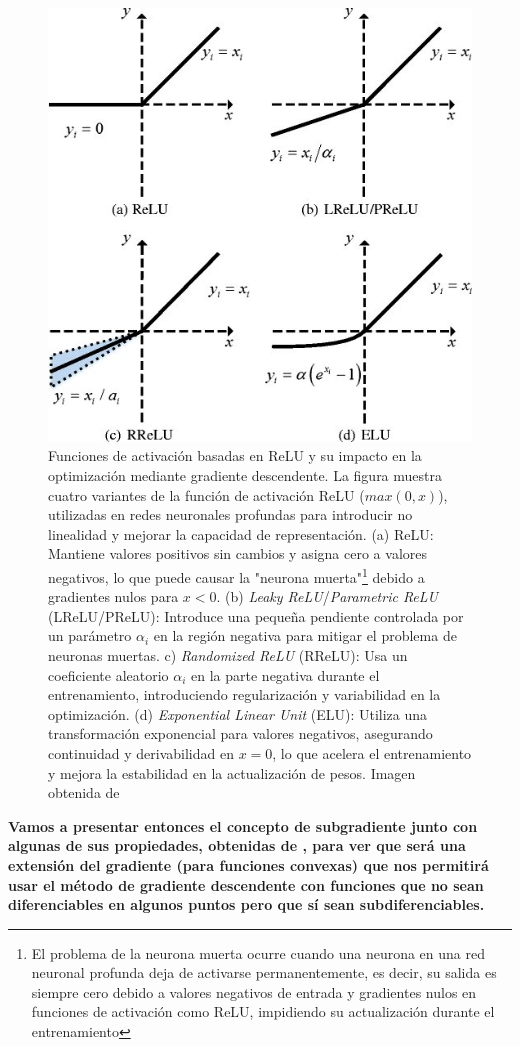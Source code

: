 \begin{figure}
    \centering
    \includegraphics[width=0.5\linewidth]{3ReLU&oth.jpg}
    \caption[Funciones de activación basadas en ReLU y su impacto en la optimización mediante gradiente descendente]{Funciones de activación basadas en ReLU y su impacto en la optimización mediante gradiente descendente. La figura muestra cuatro variantes de la función de activación ReLU ($max(0,x)$), utilizadas en redes neuronales profundas para introducir no linealidad y mejorar la capacidad de representación. (a) ReLU: Mantiene valores positivos sin cambios y asigna cero a valores negativos, lo que puede causar la "neurona muerta"\footnote{El problema de la neurona muerta ocurre cuando una neurona en una red neuronal profunda deja de activarse permanentemente, es decir, su salida es siempre cero debido a valores negativos de entrada y gradientes nulos en funciones de activación como ReLU, impidiendo su actualización durante el entrenamiento} debido a gradientes nulos para $x<0$. (b) \textit{Leaky ReLU}/\textit{Parametric ReLU} (LReLU/PReLU): Introduce una pequeña pendiente controlada por un parámetro $\alpha _i$ en la región negativa para mitigar el problema de neuronas muertas. c) \textit{Randomized ReLU} (RReLU): Usa un coeficiente aleatorio $\alpha _i $ en la parte negativa durante el entrenamiento, introduciendo regularización y variabilidad en la optimización. (d) \textit{Exponential Linear Unit} (ELU): Utiliza una transformación exponencial para valores negativos, asegurando continuidad y derivabilidad en $x=0$, lo que acelera el entrenamiento y mejora la estabilidad en la actualización de pesos. Imagen obtenida de \cite{figRelu1}}
    \label{fig:3.ReLU}
\end{figure}



\textbf{Vamos a presentar entonces el concepto de subgradiente junto con algunas de sus propiedades, obtenidas de \cite{convexSubgrad}, para ver que será una extensión del gradiente (para funciones convexas) que nos permitirá usar el método de gradiente descendente con funciones que no sean diferenciables en algunos puntos pero que sí sean subdiferenciables.}

